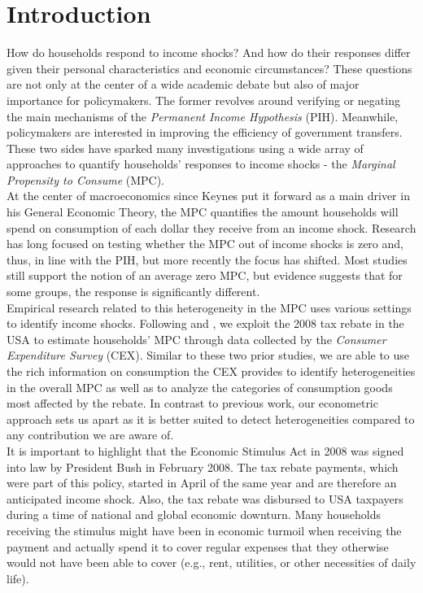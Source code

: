 \section{Introduction} \label{sec:intro}
How do households respond to income shocks? And how do their responses differ given their personal characteristics and economic circumstances? These questions are not only at the center of a wide academic debate but also of major importance for policymakers. The former revolves around verifying or negating the main mechanisms of the \textit{Permanent Income Hypothesis} (PIH). Meanwhile, policymakers are interested in improving the efficiency of government transfers. These two sides have sparked many investigations using a wide array of approaches to quantify households' responses to income shocks - the \textit{Marginal Propensity to Consume} (MPC). \\
At the center of macroeconomics since Keynes put it forward as a main driver in his General Economic Theory, the MPC quantifies the amount households will spend on consumption of each dollar they receive from an income shock. Research has long focused on testing whether the MPC out of income shocks is zero and, thus, in line with the PIH, but more recently the focus has shifted. Most studies still support the notion of an average zero MPC, but evidence suggests that for some groups, the response is significantly different. \\
Empirical research related to this heterogeneity in the MPC uses various settings to identify income shocks. Following \cite{parker_etal_13} and \cite{ms_14}, we exploit the 2008 tax rebate in the USA to estimate households' MPC through data collected by the \textit{Consumer Expenditure Survey} (CEX). Similar to these two prior studies, we are able to use the rich information on consumption the CEX provides to identify heterogeneities in the overall MPC as well as to analyze the categories of consumption goods most affected by the rebate. In contrast to previous work, our econometric approach sets us apart as it is better suited to detect heterogeneities compared to any contribution we are aware of. \\ 
It is important to highlight that the Economic Stimulus Act in 2008 was signed into law by President Bush in February 2008. The tax rebate payments, which were part of this policy, started in April of the same year and are therefore an anticipated income shock. Also, the tax rebate was disbursed to USA taxpayers during a time of national and global economic downturn. Many households receiving the stimulus might have been in economic turmoil when receiving the payment and actually spend it to cover regular expenses that they otherwise would not have been able to cover (e.g., rent, utilities, or other necessities of daily life). \\
